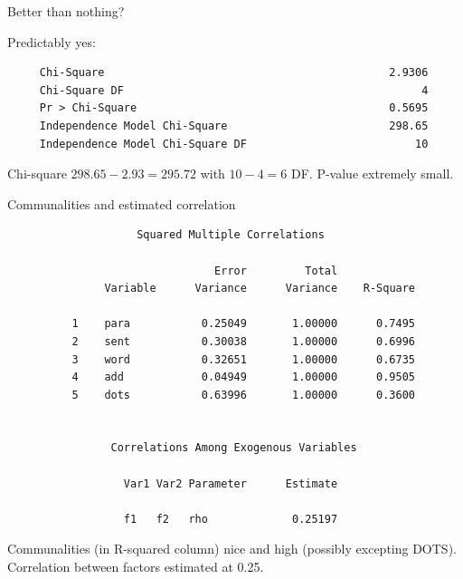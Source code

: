 \documentclass[pdf]{prosper}
\begin{document}
  \begin{slide}{Better than nothing?}

Predictably yes:

{\scriptsize
\begin{verbatim}
     Chi-Square                                            2.9306
     Chi-Square DF                                              4
     Pr > Chi-Square                                       0.5695
     Independence Model Chi-Square                         298.65
     Independence Model Chi-Square DF                          10

\end{verbatim}
}

Chi-square $298.65-2.93=295.72$ with $10-4=6$ DF. P-value extremely small.
    
  \end{slide}

  \begin{slide}{Communalities and estimated correlation}

{\scriptsize
\begin{verbatim}
                    Squared Multiple Correlations
 
                                Error         Total
               Variable      Variance      Variance    R-Square

          1    para           0.25049       1.00000      0.7495
          2    sent           0.30038       1.00000      0.6996
          3    word           0.32651       1.00000      0.6735
          4    add            0.04949       1.00000      0.9505
          5    dots           0.63996       1.00000      0.3600


                Correlations Among Exogenous Variables
 
                  Var1 Var2 Parameter      Estimate

                  f1   f2   rho             0.25197

\end{verbatim}
}

Communalities (in R-squared column) nice and high (possibly excepting DOTS). Correlation between factors estimated at 0.25.
    
  \end{slide}
\end{document}
